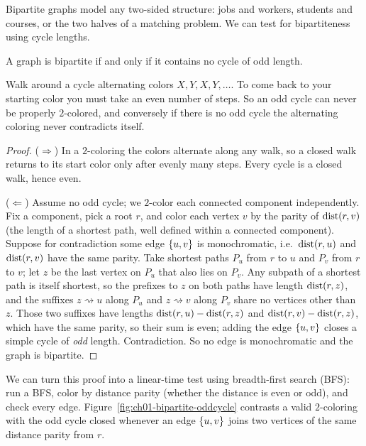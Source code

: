 Bipartite graphs model any two-sided structure: jobs and workers, students and courses, or the two halves of a matching problem. We can test for bipartiteness using cycle lengths.

\begin{theorem}
\label{ch01:bip-oddcycle}
A graph is bipartite if and only if it contains no cycle of odd length.
\end{theorem}

\begin{whybox}
Walk around a cycle alternating colors $X, Y, X, Y, \dots$. To come back to your
starting color you must take an even number of steps. So an odd cycle can never
be properly $2$-colored, and conversely if there is no odd cycle the alternating
coloring never contradicts itself.
\end{whybox}

\begin{proof}
($\Rightarrow$) In a $2$-coloring the colors alternate along any walk, so a
closed walk returns to its start color only after evenly many steps. Every cycle
is a closed walk, hence even.

($\Leftarrow$) Assume no odd cycle; we $2$-color each connected component
independently. Fix a component, pick a root $r$, and color each vertex $v$ by
the parity of $\operatorname{dist}(r,v)$ (the length of a shortest path, well defined within a
connected component). Suppose for contradiction some edge $\{u,v\}$ is
monochromatic, i.e.\ $\operatorname{dist}(r,u)$ and $\operatorname{dist}(r,v)$ have the same parity. Take
shortest paths $P_u$ from $r$ to $u$ and $P_v$ from $r$ to $v$; let $z$ be the
last vertex on $P_u$ that also lies on $P_v$. Any subpath of a shortest path is
itself shortest, so the prefixes to $z$ on both paths have length $\operatorname{dist}(r,z)$,
and the suffixes $z\rightsquigarrow u$ along $P_u$ and $z\rightsquigarrow v$
along $P_v$ share no vertices other than $z$. Those two suffixes have lengths
$\operatorname{dist}(r,u)-\operatorname{dist}(r,z)$ and $\operatorname{dist}(r,v)-\operatorname{dist}(r,z)$, which have the same parity,
so their sum is even; adding the edge $\{u,v\}$ closes a simple cycle of
\emph{odd} length. Contradiction. So no edge is monochromatic and the graph is
bipartite.
\end{proof}

We can turn this proof into a linear-time test using breadth-first search (BFS): run a BFS, color by distance parity (whether the distance is even or odd), and check every edge. Figure~\ref{fig:ch01-bipartite-oddcycle} contrasts a valid $2$-coloring
with the odd cycle closed whenever an edge $\{u,v\}$ joins two vertices of the
same distance parity from $r$.

